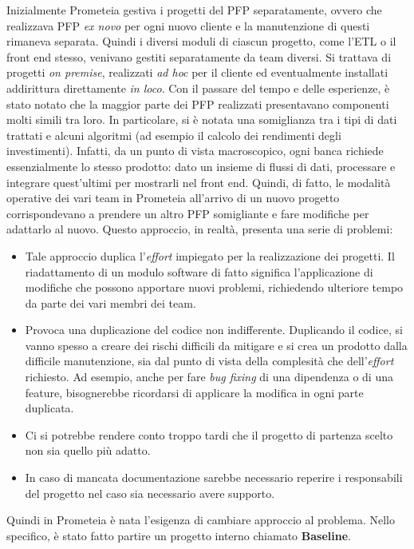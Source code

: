 Inizialmente Prometeia gestiva i progetti del PFP separatamente, ovvero che realizzava PFP \textit{ex novo} per ogni nuovo cliente e la manutenzione di questi rimaneva separata.
Quindi i diversi moduli di ciascun progetto, come l'ETL o il front end stesso, venivano gestiti separatamente da team diversi.
Si trattava di progetti \textit{on premise}, realizzati \textit{ad hoc} per il cliente ed eventualmente installati addirittura direttamente \textit{in loco}.
Con il passare del tempo e delle esperienze, è stato notato che la maggior parte dei PFP realizzati presentavano componenti molti simili tra loro.
In particolare, si è notata una somiglianza tra i tipi di dati trattati e alcuni algoritmi (ad esempio il calcolo dei rendimenti degli investimenti).
Infatti, da un punto di vista macroscopico, ogni banca richiede essenzialmente lo stesso prodotto:
dato un insieme di flussi di dati, processare e integrare quest'ultimi per mostrarli nel front end.
Quindi, di fatto, le modalità operative dei vari team in Prometeia all'arrivo di un nuovo progetto corrispondevano a prendere un altro PFP somigliante e fare modifiche per adattarlo al nuovo.
Questo approccio, in realtà, presenta una serie di problemi:
\begin{itemize}
    \item Tale approccio duplica l'\textit{effort} impiegato per la realizzazione dei progetti.
    Il riadattamento di un modulo software di fatto significa l'applicazione di modifiche che possono apportare nuovi problemi, richiedendo ulteriore tempo da parte dei vari membri dei team.
    \item Provoca una duplicazione del codice non indifferente.
    Duplicando il codice, si vanno spesso a creare dei rischi difficili da mitigare e si crea un prodotto dalla difficile manutenzione, sia dal punto di vista della complesità che dell'\textit{effort} richiesto.
    Ad esempio, anche per fare \textit{bug fixing} di una dipendenza o di una feature, bisognerebbe ricordarsi di applicare la modifica in ogni parte duplicata.
    \item Ci si potrebbe rendere conto troppo tardi che il progetto di partenza scelto non sia quello più adatto.
    \item In caso di mancata documentazione sarebbe necessario reperire i responsabili del progetto nel caso sia necessario avere supporto.
\end{itemize}
Quindi in Prometeia è nata l'esigenza di cambiare approccio al problema.
Nello specifico, è stato fatto partire un progetto interno chiamato \textbf{Baseline}.
